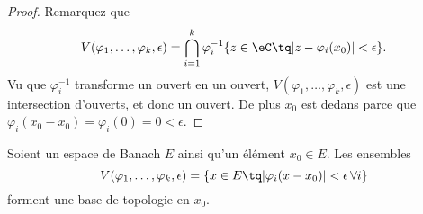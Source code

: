 \begin{proof}
	Remarquez que
	\begin{equation}
		V(\varphi_1,\ldots, \varphi_k,\epsilon)=\bigcap_{i=1}^k\varphi_i^{-1}\{ z\in \eC\tq | z-\varphi_i(x_0) | <\epsilon \}.
	\end{equation}
	Vu que \( \varphi_i^{-1}\) transforme un ouvert en un ouvert, \( V(\varphi_1,\ldots, \varphi_k,\epsilon)\) est une intersection d'ouverts, et donc un ouvert. De plus \( x_0\) est dedans parce que \( \varphi_i(x_0-x_0)=\varphi_i(0)=0 <\epsilon\).
\end{proof}

\begin{lemma}
	Soient un espace de Banach \( E\) ainsi qu'un élément \( x_0\in E\). Les ensembles
	\begin{equation}
		V(\varphi_1,\ldots, \varphi_k,\epsilon)=\{ x\in E\tq | \varphi_i(x-x_0) |<\epsilon\,\forall i \}
	\end{equation}
	forment une base de topologie en \( x_0\).
\end{lemma}

